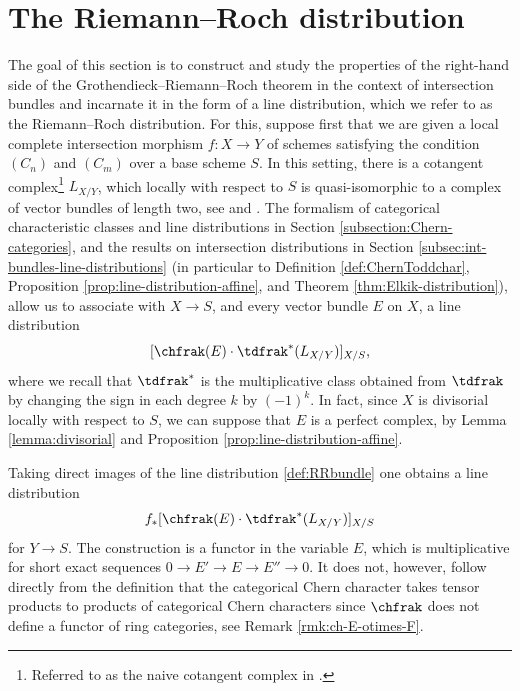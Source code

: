 \section{The Riemann--Roch distribution}\label{sec:RR-distribution}
The goal of this section is to construct and study the properties of the right-hand side of the Grothendieck--Riemann--Roch theorem in the context of intersection bundles and incarnate it in the form of a line distribution, which we refer to as the Riemann--Roch distribution. For this, suppose first that we are given a local complete intersection morphism $f \colon X \to Y$ of schemes satisfying the condition $(C_n)$ and $(C_m)$ over a base scheme $S$. In this setting, there is a cotangent complex\footnote{Referred to as the naive cotangent complex in \cite[\href{https://stacks.math.columbia.edu/tag/08P5}{08P5}]{stacks-project}.} $L_{X/Y}$, which locally with respect to $S$ is quasi-isomorphic to a complex of vector bundles of length two, see \cite[\href{https://stacks.math.columbia.edu/tag/08TJ}{08TJ}]{stacks-project} and \cite[\href{https://stacks.math.columbia.edu/tag/0FV4}{0FV4}]{stacks-project}. The formalism of categorical characteristic classes and line distributions in Section \ref{subsection:Chern-categories}, and the results on intersection distributions in Section \ref{subsec:int-bundles-line-distributions} (in particular to Definition \ref{def:ChernToddchar}, Proposition \ref{prop:line-distribution-affine}, and Theorem \ref{thm:Elkik-distribution}), allow us to associate with $X\to S$, and every vector bundle $E$ on $X$, a line distribution
\begin{equation}\label{def:RRbundle}
[\chfrak(E)\cdot \tdfrak^{*}(L_{X/Y})]_{X/S},
\end{equation}
where we recall that $\tdfrak^\ast$ is the multiplicative class obtained from $\tdfrak$ by changing the sign in each degree $k$ by $(-1)^{k}$. In fact, since $X$ is divisorial locally with respect to $S$, we can suppose that $E$ is a perfect complex, by Lemma \ref{lemma:divisorial} and Proposition \ref{prop:line-distribution-affine}.

Taking direct images of the line distribution \eqref{def:RRbundle} one obtains a line distribution
\begin{equation}\label{def:RRdistribution}
f_\ast [\chfrak(E)\cdot \tdfrak^{*}(L_{X/Y})]_{X/S}
\end{equation}
for $Y\to S$. The construction is a functor in the variable $E$, which is multiplicative for short exact sequences $0 \to E' \to E \to E'' \to 0$. It does not, however, follow directly from the definition that the categorical Chern character takes tensor products to products of categorical Chern characters since $\chfrak$ does not define a functor of ring categories, see Remark \ref{rmk:ch-E-otimes-F}.

